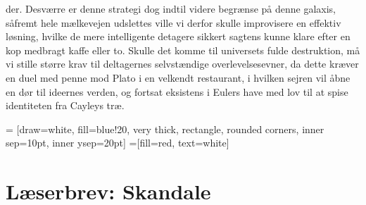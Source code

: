 \begin{minipage}[b]{0.95\linewidth}
\begin{minipage}[t]{0.47\textwidth}
der. Desværre er denne strategi dog indtil videre begrænse på denne galaxis, såfremt hele mælkevejen udslettes ville vi derfor skulle improvisere en effektiv løsning, hvilke de mere intelligente detagere sikkert sagtens kunne klare efter en kop medbragt kaffe eller to. Skulle det komme til universets fulde destruktion, må vi stille større krav til deltagernes selvstændige overlevelsesevner, da dette kræver en duel med penne mod Plato i en velkendt restaurant, i hvilken sejren vil åbne en dør til ideernes verden, og fortsat eksistens i Eulers have med lov til at spise identiteten fra Cayleys træ.


\end{minipage}
\hfill\begin{minipage}[t]{0.47\textwidth}

\vspace{1mm}
 = [draw=white, fill=blue!20, very thick,
    rectangle, rounded corners, inner sep=10pt, inner ysep=20pt]
 =[fill=red, text=white]

%
\vspace{2mm}

\section*{Læserbrev: Skandale}


\end{minipage}
\end{minipage}
